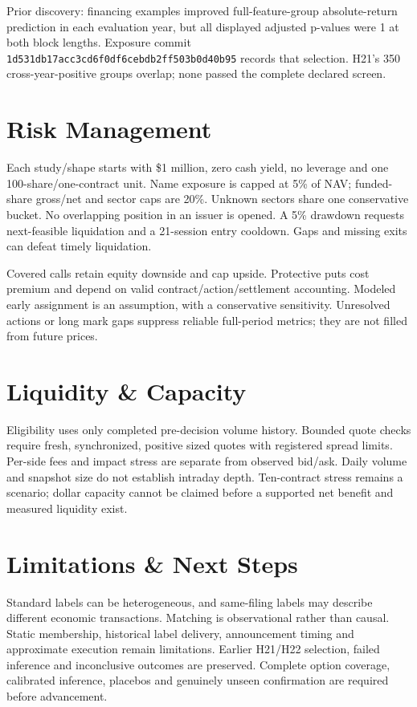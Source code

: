\documentclass[11pt,letterpaper]{article}
\begin{document}
Prior discovery: financing examples improved full-feature-group absolute-return prediction in each evaluation year, but all displayed adjusted p-values were 1 at both block lengths. Exposure commit \nolinkurl{1d531db17acc3cd6f0df6cebdb2ff503b0d40b95} records that selection. H21's 350 cross-year-positive groups overlap; none passed the complete declared screen.


\clearpage
\section{Risk Management}
Each study/shape starts with \$1 million, zero cash yield, no leverage and one 100-share/one-contract unit. Name exposure is capped at 5\% of NAV; funded-share gross/net and sector caps are 20\%. Unknown sectors share one conservative bucket. No overlapping position in an issuer is opened. A 5\% drawdown requests next-feasible liquidation and a 21-session entry cooldown. Gaps and missing exits can defeat timely liquidation.

Covered calls retain equity downside and cap upside. Protective puts cost premium and depend on valid contract/action/settlement accounting. Modeled early assignment is an assumption, with a conservative sensitivity. Unresolved actions or long mark gaps suppress reliable full-period metrics; they are not filled from future prices.

\section{Liquidity \& Capacity}
Eligibility uses only completed pre-decision volume history. Bounded quote checks require fresh, synchronized, positive sized quotes with registered spread limits. Per-side fees and impact stress are separate from observed bid/ask. Daily volume and snapshot size do not establish intraday depth. Ten-contract stress remains a scenario; dollar capacity cannot be claimed before a supported net benefit and measured liquidity exist.

\section{Limitations \& Next Steps}
Standard labels can be heterogeneous, and same-filing labels may describe different economic transactions. Matching is observational rather than causal. Static membership, historical label delivery, announcement timing and approximate execution remain limitations. Earlier H21/H22 selection, failed inference and inconclusive outcomes are preserved. Complete option coverage, calibrated inference, placebos and genuinely unseen confirmation are required before advancement.
\end{document}
